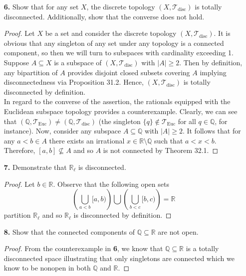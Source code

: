 \documentclass[ 12pt ]{article}
\begin{document}
\begin{enumerate}
	\item[\textbf{6.}] Show that for any set $X$, the discrete topology $(X, \mathcal{T}_\mathrm{disc})$ is totally disconnected. Additionally, show that the converse does not hold.

		\begin{proof}
			Let $X$ be a set and consider the discrete topology $(X, \mathcal{T}_\mathrm{disc})$. It is obvious that any singleton of any set under any topology is a connected component,
			so then we will turn to subspaces with cardinality exceeding 1. Suppose $A \subseteq X$ is a subspace of $(X, \mathcal{T}_\mathrm{disc})$ with $|A| \geq 2$. Then by
			definition, any bipartition of $A$ provides disjoint closed subsets covering $A$ implying disconnectedness via Proposition 31.2. Hence, $(X, \mathcal{T}_\mathrm{disc})$ is
			totally disconnected by definition. \\

			In regard to the converse of the assertion, the rationals equipped with the Euclidean subspace topology provides a counterexample. Clearly, we can see that $(\mathbb{Q},
			\mathcal{T}_\mathrm{Euc}) \neq (\mathbb{Q}, \mathcal{T}_\mathrm{disc})$ (the singleton $\{ q \} \notin \mathcal{T}_\mathrm{Euc}$ for all $q \in \mathbb{Q}$, for instance).
			Now, consider any subspace $A \subseteq \mathbb{Q}$ with $|A| \geq 2$. It follows that for any $a < b \in A$ there exists an irrational $x \in \mathbb{R} \setminus
			\mathbb{Q}$ such that $a < x < b$. Therefore, $[a, b] \nsubseteq A$ and so $A$ is not connected by Theorem 32.1.
		\end{proof}


	\item[\textbf{7.}] Demonstrate that $\mathbb{R}_\ell$ is disconnected.

		\begin{proof}
			Let $b \in \mathbb{R}$. Observe that the following open sets $$\left ( \bigcup_{a < b} [a, b) \right ) \bigcup \left ( \bigcup_{b < c} [b, c) \right ) = \mathbb{R}$$
			partition $\mathbb{R}_\ell$ and so $\mathbb{R}_\ell$ is disconnected by definition.
		\end{proof}


	\item[\textbf{8.}] Show that the connected components of $\mathbb{Q} \subseteq \mathbb{R}$ are not open.

		\begin{proof}
			From the counterexample in \textbf{6}, we know that $\mathbb{Q} \subseteq \mathbb{R}$ is a totally disconnected space illustrating that only singletons are connected
			which we know to be nonopen in both $\mathbb{Q}$ and $\mathbb{R}$.
		\end{proof}


\end{enumerate}
\end{document}

